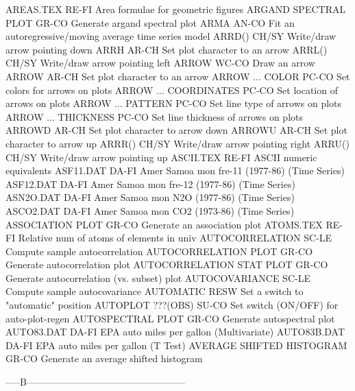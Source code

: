 AREAS.TEX                   RE-FI Area formulae for geometric figures
ARGAND SPECTRAL PLOT        GR-CO Generate argand spectral plot
ARMA                        AN-CO Fit an autoregressive/moving average time series model
ARRD()                      CH/SY Write/draw arrow pointing down
ARRH                        AR-CH Set plot character to an arrow
ARRL()                      CH/SY Write/draw arrow pointing left
ARROW                       WC-CO Draw an arrow
ARROW                       AR-CH Set plot character to an arrow
ARROW ... COLOR             PC-CO Set colors for arrows on plots
ARROW ... COORDINATES       PC-CO Set location of arrows on plots
ARROW ... PATTERN           PC-CO Set line type of arrows on plots
ARROW ... THICKNESS         PC-CO Set line thickness of arrows on plots
ARROWD                      AR-CH Set plot character to arrow down
ARROWU                      AR-CH Set plot character to arrow up
ARRR()                      CH/SY Write/draw arrow pointing right
ARRU()                      CH/SY Write/draw arrow pointing up
ASCII.TEX                   RE-FI ASCII numeric equivalents
ASF11.DAT                   DA-FI Amer Samoa mon fre-11 (1977-86) (Time Series)
ASF12.DAT                   DA-FI Amer Samoa mon fre-12 (1977-86) (Time Series)
ASN2O.DAT                   DA-FI Amer Samoa mon N2O (1977-86) (Time Series)
ASCO2.DAT                   DA-FI Amer Samoa mon CO2 (1973-86) (Time Series)
ASSOCIATION PLOT            GR-CO Generate an association plot
ATOMS.TEX                   RE-FI Relative num of atoms of elements in univ
AUTOCORRELATION             SC-LE Compute sample autocorrelation
AUTOCORRELATION PLOT        GR-CO Generate autocorrelation plot
AUTOCORRELATION STAT PLOT   GR-CO Generate autocorrelation (vs. subset) plot
AUTOCOVARIANCE              SC-LE Compute sample autocovariance
AUTOMATIC                   RESW  Set a switch to "automatic" position
AUTOPLOT ???(OBS)           SU-CO Set switch (ON/OFF) for auto-plot-regen
AUTOSPECTRAL PLOT           GR-CO Generate autospectral plot
AUTO83.DAT                  DA-FI EPA auto miles per gallon (Multivariate)
AUTO83B.DAT                 DA-FI EPA auto miles per gallon (T Test)
AVERAGE SHIFTED HISTOGRAM   GR-CO Generate an average shifted histogram

-----B--------------------------------------------------

